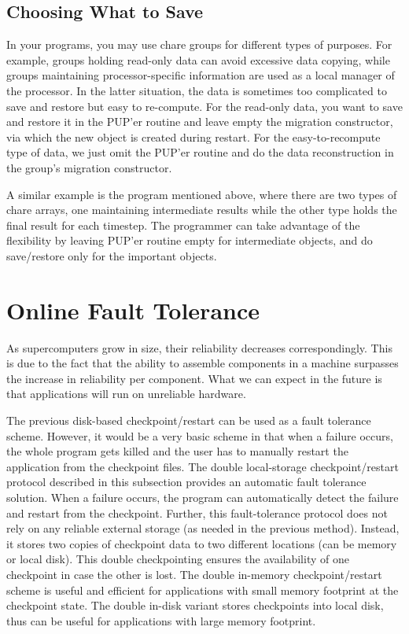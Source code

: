 \subsection{Choosing What to Save}

In your programs, you may use chare groups for different types of
purposes.  For example, groups holding read-only data can avoid
excessive data copying, while groups maintaining processor-specific
information are used as a local manager of the processor. In the
latter situation, the data is sometimes too complicated to save and
restore but easy to re-compute. For the read-only data, you want to
save and restore it in the PUP'er routine and leave empty the
migration constructor, via which the new object is created during
restart.  For the easy-to-recompute type of data, we just omit the
PUP'er routine and do the data reconstruction in the group's migration
constructor.

A similar example is the program mentioned above, where there are two
types of chare arrays, one maintaining intermediate results while the
other type holds the final result for each timestep. The programmer
can take advantage of the flexibility by leaving PUP'er routine empty
for intermediate objects, and do save/restore only for the important
objects.

\section{Online Fault Tolerance}
\label{sec:MemCheckpointing}
As supercomputers grow in size, their reliability decreases
correspondingly. This is due to the fact that the ability to assemble
components in a machine surpasses the increase in reliability per
component. What we can expect in the future is that applications will
run on unreliable hardware.

The previous disk-based checkpoint/restart can be used as a fault
tolerance scheme. However, it would be a very basic scheme in that
when a failure occurs, the whole program gets killed and the user has
to manually restart the application from the checkpoint files.  The
double local-storage checkpoint/restart protocol described in this
subsection provides an automatic fault tolerance solution. When a
failure occurs, the program can automatically detect the failure and
restart from the checkpoint.  Further, this fault-tolerance protocol
does not rely on any reliable external storage (as needed in the previous
method).  Instead, it stores two copies of checkpoint data to two
different locations (can be memory or local disk).  This double
checkpointing ensures the availability of one checkpoint in case the
other is lost.  The double in-memory checkpoint/restart scheme is
useful and efficient for applications with small memory footprint at
the checkpoint state.  The double in-disk variant stores checkpoints
into local disk, thus can be useful for applications with large memory
footprint.


